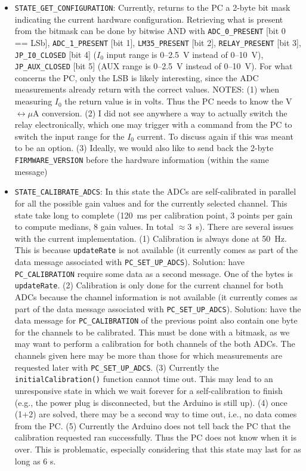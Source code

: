 \documentclass[11pt,a4paper,english]{article}
\begin{document}
\begin{itemize}
\item \texttt{STATE\_GET\_CONFIGURATION}: Currently, returns to the PC a 2-byte bit mask indicating the current hardware configuration. Retrieving what is present from the bitmask can be done by bitwise AND with \texttt{ADC\_0\_PRESENT} [bit 0 == LSb], \texttt{ADC\_1\_PRESENT} [bit 1], \texttt{LM35\_PRESENT} [bit 2], \texttt{RELAY\_PRESENT} [bit 3], \texttt{JP\_I0\_CLOSED} [bit 4] ($I_0$ input range is 0--2.5~V instead of 0--10~V), \texttt{JP\_AUX\_CLOSED} [bit 5] (AUX range is 0--2.5~V instead of 0--10~V). For what concerns the PC, only the LSB is likely interesting, since the ADC measurements already return with the correct values. NOTES: (1) when measuring $I_0$ the return value is in volts. Thus the PC needs to know the V$\leftrightarrow\mu$A conversion. (2) I did not see anywhere a way to actually switch the relay electronically, which one may trigger with a command from the PC to switch the input range for the $I_0$ current. To discuss again if this was meant to be an option. (3) Ideally, we would also like to send back the 2-byte \texttt{FIRMWARE\_VERSION} before the hardware information (within the same message)

\item \texttt{STATE\_CALIBRATE\_ADCS}: In this state the ADCs are self-calibrated in parallel for all the possible gain values and for the currently selected channel. This state take long to complete (120~ms per calibration point, 3 points per gain to compute medians, 8 gain values. In total $\approx3$~s). There are several issues with the current implementation. (1) Calibration is always done at 50~Hz. This is because \texttt{updateRate} is not available (it currently comes as part of the data message associated with \texttt{PC\_SET\_UP\_ADCS}). Solution: have \texttt{PC\_CALIBRATION} require some data as a second message. One of the bytes is \texttt{updateRate}. (2) Calibration is only done for the current channel for both ADCs because the channel information is not available (it currently comes as part of the data message associated with \texttt{PC\_SET\_UP\_ADCS}). Solution: have the data message for \texttt{PC\_CALIBRATION} of the previous point also contain one byte for the channels to be calibrated. This must be done with a bitmask, as we may want to perform a calibration for both channels of the both ADCs. The channels given here may be more than those for which measurements are requested later with \texttt{PC\_SET\_UP\_ADCS}. (3) Currently the \texttt{initialCalibration()} function cannot time out. This may lead to an unresponsive state in which we wait forever for a self-calibration to finish (e.g., the power plug is disconnected, but the Arduino is still up). (4) once (1+2) are solved, there may be a second way to time out, i.e., no data comes from the PC. (5) Currently the Arduino does not tell back the PC that the calibration requested ran successfully. Thus the PC does not know when it is over. This is problematic, especially considering that this state may last for as long as 6 s.

\end{itemize}
\end{document}
